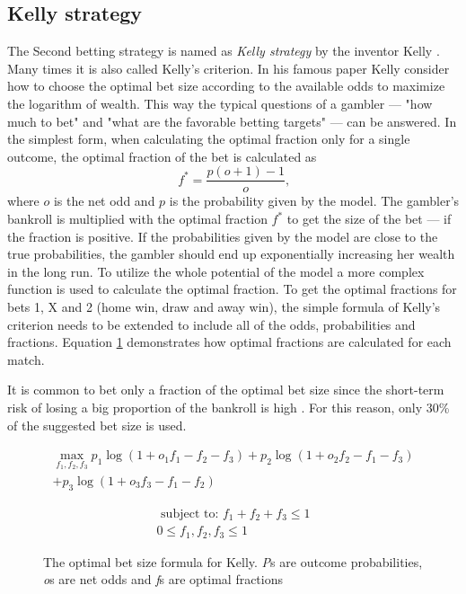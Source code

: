 \subsection{Kelly strategy}
The Second betting strategy is named as \textit{Kelly strategy} by the inventor Kelly \cite{kelly2011new}. Many times it is also called Kelly's criterion. In his famous paper \cite{kelly2011new} Kelly consider how to choose the optimal bet size according to the available odds to maximize the logarithm of wealth. This way the typical questions of a gambler --- "how much to bet" and "what are the favorable betting targets" ---  can be answered. In the simplest form, when calculating the optimal fraction only for a single outcome, the optimal fraction of the bet is calculated as
\begin{equation}
f ^ { * } =  \frac { p ( o + 1 ) - 1 } { o }\text{,}
\end{equation}
where $o$ is the net odd and $p$ is the probability given by the model. The gambler's bankroll is multiplied with the optimal fraction $f^{*}$ to get the size of the bet --- if the fraction is positive. If the probabilities given by the model are close to the true probabilities, the gambler should end up exponentially increasing her wealth in the long run. To utilize the whole potential of the model a more complex function is used to calculate the optimal fraction. To get the optimal fractions for bets 1, X and 2 (home win, draw and away win), the simple formula of Kelly's criterion needs to be extended to include all of the odds, probabilities and fractions. Equation \ref{eq:kelly} demonstrates how optimal fractions are calculated for each match.

It is common to bet only a fraction of the optimal bet size since the short-term risk of losing a big proportion of the bankroll is high \cite{maclean2011medium}. For this reason, only 30\% of the suggested bet size is used.
\begin{figure}
    \caption{The optimal bet size formula for Kelly. \textit{P}s are outcome probabilities, \textit{o}s are net odds and \textit{f}s are optimal fractions}
     \begin{equation}
        \begin{split}
            \max_{f_1, f_2, f_3} p_1  \log(1 + o_1 f_1 - f_2 - f_3) + p_2 \log(1 + o_2 f_2 - f_1 - f_3)  \\
            + p_3 \log(1 + o_3 f_3 - f_1 - f_2)
        \end{split}
     \end{equation}

    \begin{equation*}
        \begin{split}
            \text { subject to: }  f_1 + f_2 + f_3 \leq 1 \\
             0 \leq f_1, f_2, f_3 \leq 1
         \end{split}
    \end{equation*}
    \label{eq:kelly}
\end{figure}

